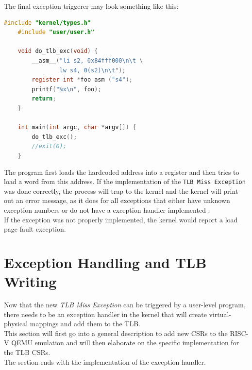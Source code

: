 The final exception triggerer may look something like this:

\begin{lstlisting}[language=c,float=h!]
    #include "kernel/types.h"
    #include "user/user.h"

    void do_tlb_exc(void) {
        __asm__("li s2, 0x84fff000\n\t \
                lw s4, 0(s2)\n\t");
        register int *foo asm ("s4");
        printf("%x\n", foo);
        return;
    }
    
    int main(int argc, char *argv[]) {
        do_tlb_exc();
        //exit(0);
    }
\end{lstlisting}
The program first loads the hardcoded address into a register and then tries to load a word from this address.
If the implementation of the \texttt{TLB Miss Exception} was done correctly, the process will trap to the kernel
and the kernel will print out an error message, as it does for all exceptions that either have unknown exception
numbers or do not have a exception handler implemented \cite{cox2011xv6}.\\
If the exception was not properly implemented, the kernel would report a load page fault exception.




\section{Exception Handling and TLB Writing}
\label{sect:tlbwrite}

Now that the new \textit{TLB Miss Exception} can be triggered by a user-level program, there needs
to be an exception handler in the kernel that will create virtual-physical mappings and add them to the
TLB.\\
This section will first go into a general description to add new CSRs to the RISC-V QEMU emulation and
will then elaborate on the specific implementation for the TLB CSRs.\\
The section ends with the implementation of the exception handler.

